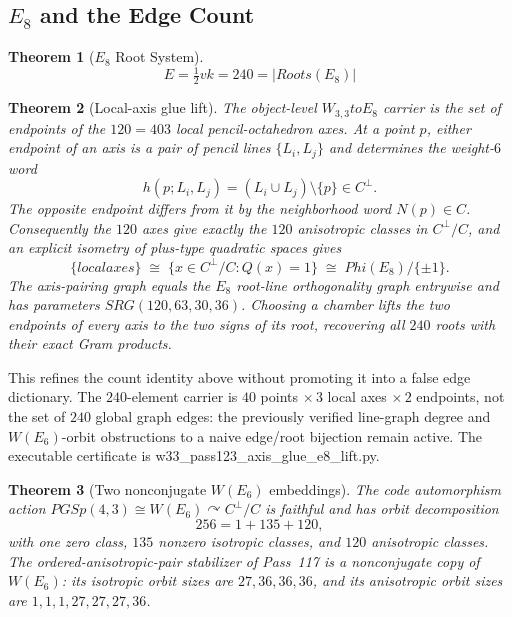 \documentclass[12pt,a4paper]{article}
\def\mathrm#1{#1}%
\def\texttt#1{#1}%
\def\text#1{#1}%
\def\Phi#1{Phi#1}%
\def\cdot{ }%
\def\to{ to }%
\newtheorem{theorem}{Theorem}[section]
\theoremstyle{definition}
\newcommand{\SRG}{\mathrm{SRG}}
\begin{document}
\subsection{\texorpdfstring{$E_8$ and the Edge Count}{E8 and the Edge Count}}

\begin{theorem}[$E_8$ Root System]
\begin{equation}
\boxed{E = \tfrac{1}{2}vk = 240 = |\mathrm{Roots}(E_8)|}
\end{equation}
\end{theorem}

\begin{theorem}[Local-axis glue lift]
\label{thm:axis-glue-e8-lift}
The object-level $W_{3,3}\to E_8$ carrier is the set of endpoints of the
$120=40\cdot3$ local pencil-octahedron axes.  At a point $p$, either endpoint
of an axis is a pair of pencil lines $\{L_i,L_j\}$ and determines the
weight-$6$ word
\[
 h(p;L_i,L_j)=(L_i\cup L_j)\setminus\{p\}\in C^\perp.
\]
The opposite endpoint differs from it by the neighborhood word $N(p)\in C$.
Consequently the $120$ axes give exactly the $120$ anisotropic classes in
$C^\perp/C$, and an explicit isometry of plus-type quadratic spaces gives
\[
 \{\text{local axes}\}\;\cong\;
 \{x\in C^\perp/C:Q(x)=1\}\;\cong\;\Phi(E_8)/\{\pm1\}.
\]
The axis-pairing graph equals the $E_8$ root-line orthogonality graph
entrywise and has parameters $\SRG(120,63,30,36)$.  Choosing a chamber lifts
the two endpoints of every axis to the two signs of its root, recovering all
$240$ roots with their exact Gram products.
\end{theorem}

\noindent
This refines the count identity above without promoting it into a false edge
dictionary.  The $240$-element carrier is
$40$ points $\times\,3$ local axes $\times\,2$ endpoints, not the set of
$240$ global graph edges: the previously verified line-graph degree and
$W(E_6)$-orbit obstructions to a naive edge/root bijection remain active.
The executable certificate is
\texttt{w33\_pass123\_axis\_glue\_e8\_lift.py}.

\begin{theorem}[Two nonconjugate $W(E_6)$ embeddings]
\label{thm:two-we6-embeddings}
The code automorphism action
$\mathrm{PGSp}(4,3)\cong W(E_6)\curvearrowright C^\perp/C$ is faithful and has orbit
decomposition
\[
 256=1+135+120,
\]
with one zero class, $135$ nonzero isotropic classes, and $120$ anisotropic
classes.  The ordered-anisotropic-pair stabilizer of Pass~117 is a
nonconjugate copy of $W(E_6)$: its isotropic orbit sizes are
$27,36,36,36$, and its anisotropic orbit sizes are
$1,1,1,27,27,27,36$.
\end{theorem}
\end{document}
